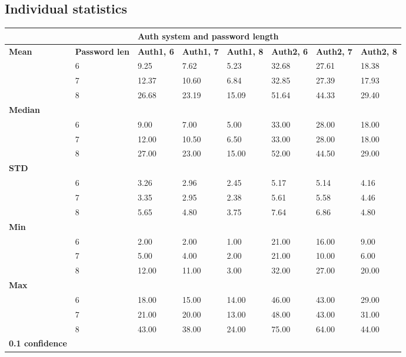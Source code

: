 \documentclass[british,10pt,a4paper]{article}
\begin{document}
\begin{appendices}
	\subsection{Individual statistics}
	\begin{table}[]
		\centering
		\begin{tabular}{|l|l|l|l|l|l|l|l|}
		\hline
		& & \multicolumn{6}{l|}{\textbf{Auth system and password length}} \\ \hline
		\textbf{Mean} & \textbf{Password len} & \textbf{Auth1, 6} & \textbf{Auth1, 7} & \textbf{Auth1, 8} & \textbf{Auth2, 6} & \textbf{Auth2, 7} & \textbf{Auth2, 8} \\ \hline
		 & 6 & 9.25 & 7.62 & 5.23 & 32.68 & 27.61 & 18.38 \\ \hline
		 & 7 & 12.37 & 10.60 & 6.84 & 32.85 & 27.39 & 17.93 \\ \hline
		 & 8 & 26.68 & 23.19 & 15.09 & 51.64 & 44.33 & 29.40 \\ \hline
		\textbf{Median} &  &  &  &  &  &  &  \\ \hline
		 & 6 & 9.00 & 7.00 & 5.00 & 33.00 & 28.00 & 18.00 \\ \hline
		 & 7 & 12.00 & 10.50 & 6.50 & 33.00 & 28.00 & 18.00 \\ \hline
		 & 8 & 27.00 & 23.00 & 15.00 & 52.00 & 44.50 & 29.00 \\ \hline
		\textbf{STD} &  &  &  &  &  &  &  \\ \hline
		 & 6 & 3.26 & 2.96 & 2.45 & 5.17 & 5.14 & 4.16 \\ \hline
		 & 7 & 3.35 & 2.95 & 2.38 & 5.61 & 5.58 & 4.46 \\ \hline
		 & 8 & 5.65 & 4.80 & 3.75 & 7.64 & 6.86 & 4.80 \\ \hline
		\textbf{Min} &  &  &  &  &  &  &  \\ \hline
		 & 6 & 2.00 & 2.00 & 1.00 & 21.00 & 16.00 & 9.00 \\ \hline
		 & 7 & 5.00 & 4.00 & 2.00 & 21.00 & 10.00 & 6.00 \\ \hline
		 & 8 & 12.00 & 11.00 & 3.00 & 32.00 & 27.00 & 20.00 \\ \hline
		\textbf{Max} &  &  &  &  &  &  &  \\ \hline
		 & 6 & 18.00 & 15.00 & 14.00 & 46.00 & 43.00 & 29.00 \\ \hline
		 & 7 & 21.00 & 20.00 & 13.00 & 48.00 & 43.00 & 31.00 \\ \hline
		 & 8 & 43.00 & 38.00 & 24.00 & 75.00 & 64.00 & 44.00 \\ \hline
		\textbf{0.1 confidence} &  &  &  &  &  &  &  \\ \hline

\end{tabular}
\end{table}
\end{appendices}
\end{document}
